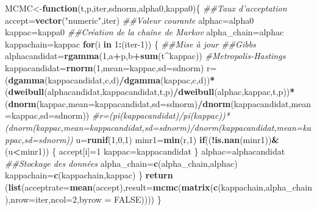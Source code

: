 \documentclass[
]{article}
\newenvironment{Shaded}{\begin{snugshade}}{\end{snugshade}}
\newcommand{\CommentTok}[1]{\textcolor[rgb]{0.56,0.35,0.01}{\textit{#1}}}
\newcommand{\ControlFlowTok}[1]{\textcolor[rgb]{0.13,0.29,0.53}{\textbf{#1}}}
\newcommand{\DataTypeTok}[1]{\textcolor[rgb]{0.13,0.29,0.53}{#1}}
\newcommand{\DecValTok}[1]{\textcolor[rgb]{0.00,0.00,0.81}{#1}}
\newcommand{\KeywordTok}[1]{\textcolor[rgb]{0.13,0.29,0.53}{\textbf{#1}}}
\newcommand{\NormalTok}[1]{#1}
\newcommand{\OperatorTok}[1]{\textcolor[rgb]{0.81,0.36,0.00}{\textbf{#1}}}
\newcommand{\OtherTok}[1]{\textcolor[rgb]{0.56,0.35,0.01}{#1}}
\newcommand{\StringTok}[1]{\textcolor[rgb]{0.31,0.60,0.02}{#1}}
\begin{document}
\begin{Shaded}
\begin{Highlighting}[]
\NormalTok{MCMC<-}\ControlFlowTok{function}\NormalTok{(t,p,iter,sdnorm,alpha0,kappa0)\{}
  \CommentTok{##Taux d'acceptation}
\NormalTok{  accept=}\KeywordTok{vector}\NormalTok{(}\StringTok{"numeric"}\NormalTok{,iter)}
  \CommentTok{##Valeur courante}
\NormalTok{  alphac=alpha0}
\NormalTok{  kappac=kappa0}
  \CommentTok{##Création de la chaîne de Markov}
\NormalTok{  alpha_chain=alphac}
\NormalTok{  kappachain=kappac}
  \ControlFlowTok{for}\NormalTok{(i }\ControlFlowTok{in} \DecValTok{1}\OperatorTok{:}\NormalTok{(iter}\DecValTok{-1}\NormalTok{))}
\NormalTok{  \{}
    \CommentTok{##Mise à jour}
    \CommentTok{##Gibbs}
\NormalTok{    alphacandidat=}\KeywordTok{rgamma}\NormalTok{(}\DecValTok{1}\NormalTok{,a}\OperatorTok{+}\NormalTok{p,b}\OperatorTok{+}\KeywordTok{sum}\NormalTok{(t}\OperatorTok{^}\NormalTok{kappac))}
    \CommentTok{#Metropolis-Hastings}
\NormalTok{    kappacandidat=}\KeywordTok{rnorm}\NormalTok{(}\DecValTok{1}\NormalTok{,}\DataTypeTok{mean=}\NormalTok{kappac,}\DataTypeTok{sd=}\NormalTok{sdnorm)}
\NormalTok{    r=(}\KeywordTok{dgamma}\NormalTok{(kappacandidat,c,d)}\OperatorTok{/}\KeywordTok{dgamma}\NormalTok{(kappac,c,d))}\OperatorTok{*}\NormalTok{(}\KeywordTok{dweibull}\NormalTok{(alphacandidat,kappacandidat,t,p)}\OperatorTok{/}\KeywordTok{dweibull}\NormalTok{(alphac,kappac,t,p))}\OperatorTok{*}\NormalTok{(}\KeywordTok{dnorm}\NormalTok{(kappac,}\DataTypeTok{mean=}\NormalTok{kappacandidat,}\DataTypeTok{sd=}\NormalTok{sdnorm)}\OperatorTok{/}\KeywordTok{dnorm}\NormalTok{(kappacandidat,}\DataTypeTok{mean=}\NormalTok{kappac,}\DataTypeTok{sd=}\NormalTok{sdnorm))}
    \CommentTok{#r=(pi(kappacandidat)/pi(kappac))*(dnorm(kappac,mean=kappacandidat,sd=sdnorm)/dnorm(kappacandidat,mean=kappac,sd=sdnorm))}
\NormalTok{    u=}\KeywordTok{runif}\NormalTok{(}\DecValTok{1}\NormalTok{,}\DecValTok{0}\NormalTok{,}\DecValTok{1}\NormalTok{)}
\NormalTok{    minr1=}\KeywordTok{min}\NormalTok{(r,}\DecValTok{1}\NormalTok{)}
    \ControlFlowTok{if}\NormalTok{((}\OperatorTok{!}\KeywordTok{is.nan}\NormalTok{(minr1))}\OperatorTok{&}\NormalTok{(u}\OperatorTok{<}\NormalTok{minr1))}
\NormalTok{    \{}
\NormalTok{      accept[i]=}\DecValTok{1}
\NormalTok{      kappac=kappacandidat}
\NormalTok{    \}}
\NormalTok{    alphac=alphacandidat}
    \CommentTok{##Stockage des données}
\NormalTok{    alpha_chain=}\KeywordTok{c}\NormalTok{(alpha_chain,alphac)}
\NormalTok{    kappachain=}\KeywordTok{c}\NormalTok{(kappachain,kappac)}
\NormalTok{    \}}
  \KeywordTok{return}\NormalTok{ (}\KeywordTok{list}\NormalTok{(}\DataTypeTok{acceptrate=}\KeywordTok{mean}\NormalTok{(accept),}\DataTypeTok{result=}\KeywordTok{mcmc}\NormalTok{(}\KeywordTok{matrix}\NormalTok{(}\KeywordTok{c}\NormalTok{(kappachain,alpha_chain),}\DataTypeTok{nrow=}\NormalTok{iter,}\DataTypeTok{ncol=}\DecValTok{2}\NormalTok{,}\DataTypeTok{byrow =} \OtherTok{FALSE}\NormalTok{))))}
\NormalTok{\}}



\end{Highlighting}
\end{Shaded}
\end{document}
